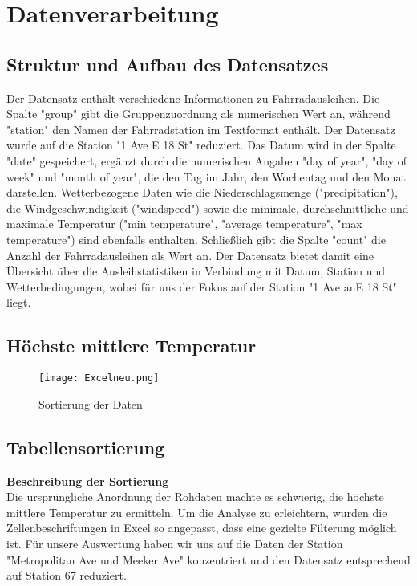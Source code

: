 \documentclass[a4paper,12pt]{article}
\begin{document}
\section{Datenverarbeitung}
\subsection{Struktur und Aufbau des Datensatzes}
Der Datensatz enthält verschiedene Informationen zu Fahrradausleihen. Die Spalte "group" gibt die Gruppenzuordnung als numerischen Wert an, während "station" den Namen der Fahrradstation im Textformat enthält. Der Datensatz wurde auf die Station "1 Ave E 18 St" reduziert. Das Datum wird in der Spalte "date" gespeichert, ergänzt durch die numerischen Angaben "day of year", "day of week" und "month of year", die den Tag im Jahr, den Wochentag und den Monat darstellen. Wetterbezogene Daten wie die Niederschlagsmenge ("precipitation"), die Windgeschwindigkeit ("windspeed") sowie die minimale, durchschnittliche und maximale Temperatur ("min temperature", "average temperature", "max temperature") sind ebenfalls enthalten. Schließlich gibt die Spalte "count" die Anzahl der Fahrradausleihen als Wert an. Der Datensatz bietet damit eine Übersicht über die Ausleihstatistiken in Verbindung mit Datum, Station und Wetterbedingungen, wobei für uns  der Fokus auf der Station "1 Ave anE 18 St" liegt.


\subsection{Höchste mittlere Temperatur}


\begin{figure}[h]
    \centering
    \texttt{[image: Excelneu.png]}
    \caption{Sortierung der Daten}
    \label{fig:enter-label}
\end{figure}

\subsection{Tabellensortierung}
\textbf{Beschreibung der Sortierung}\\Die ursprüngliche Anordnung der Rohdaten machte es schwierig, die höchste mittlere Temperatur zu  ermitteln. Um die Analyse zu erleichtern, wurden die Zellenbeschriftungen in Excel so angepasst, dass eine gezielte Filterung möglich ist. Für unsere Auswertung haben wir uns auf die Daten der Station "Metropolitan Ave und Meeker Ave" konzentriert und den Datensatz entsprechend auf Station 67 reduziert.
\end{document}
